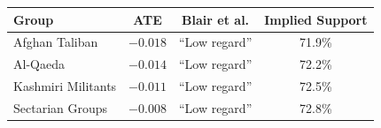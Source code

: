 \begin{tabular}{lccc}
\toprule
Group & ATE & Blair et al. & Implied Support \\
\midrule
Afghan Taliban & $-0.018$ & ``Low regard'' & 71.9\% \\
Al-Qaeda & $-0.014$ & ``Low regard'' & 72.2\% \\
Kashmiri Militants & $-0.011$ & ``Low regard'' & 72.5\% \\
Sectarian Groups & $-0.008$ & ``Low regard'' & 72.8\% \\
\bottomrule
\end{tabular}
